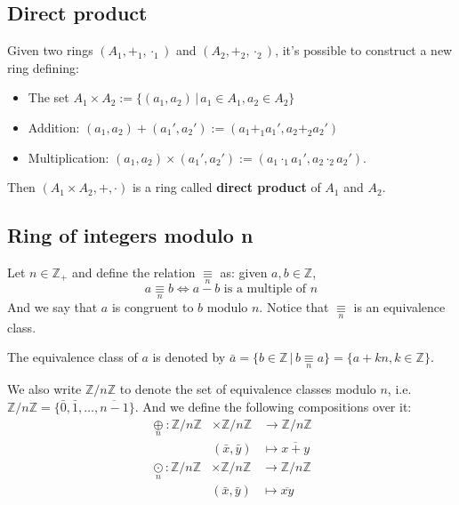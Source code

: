 \documentclass[12pt,a4paper]{article}
\theoremstyle{definition}
\begin{document}
\subsection{Direct product}\label{direct-product}

Given two rings \((A_1, +_1, \cdot_1)\) and \((A_2, +_2, \cdot_2)\), it's possible to construct a new ring defining:

\begin{itemize}
\item
  The set
  \(A_1 \times A_2 := \{ (a_1, a_2) \, | \, a_1 \in A_1, a_2 \in A_2 \}\)
\item
  Addition:
  \((a_1, a_2) + (a_1', a_2') := (a_1 +_1 a_1', a_2 +_2 a_2')\)
\item
  Multiplication:
  \((a_1, a_2) \times (a_1', a_2') := (a_1 \cdot_1 a_1', a_2 \cdot_2 a_2')\).
\end{itemize}

Then \((A_1 \times A_2, +, \cdot)\) is a ring called \textbf{direct product} of \(A_1\) and \(A_2\).

\subsection{Ring of integers modulo n}

Let \(n \in \mathbb{Z}_+\) and define the relation \(\underset{n}{\equiv}\) as: given $a,b \in \mathbb{Z}$,
\[ a \underset{n}{\equiv} b \iff a - b \text{ is a multiple of } n \]
And we say that $a$ is congruent to $b$ modulo $n$. Notice that \(\underset{n}{\equiv}\) is an equivalence class.

The equivalence class of $a$ is denoted by \(\bar{a} = \{ b \in \mathbb{Z} \, | \, b \underset{n}{\equiv} a \} = \{ a+kn, k \in \mathbb{Z} \}\).

We also write \(\mathbb{Z}/n \mathbb{Z}\) to denote the set of equivalence classes modulo \(n\), i.e. \(\mathbb{Z}/n \mathbb{Z} = \{ \bar{0}, \bar{1}, \ldots, \overline{n-1} \}\). And we define the following compositions over it:
\begin{equation*}
\begin{aligned}
\underset{n}{\oplus}:  \mathbb{Z}/n \mathbb{Z} & \times \mathbb{Z}/n \mathbb{Z} &\to \mathbb{Z}/n \mathbb{Z}\\
&(\bar{x}, \bar{y}) &\mapsto \overline{x+y}
\end{aligned}
\end{equation*}
\begin{equation*}
\begin{aligned}
\underset{n}{\odot}: \mathbb{Z}/n \mathbb{Z} & \times \mathbb{Z}/n \mathbb{Z} &\to \mathbb{Z}/n \mathbb{Z}\\
&(\bar{x}, \bar{y}) &\mapsto \overline{xy}
\end{aligned}
\end{equation*}
\end{document}
